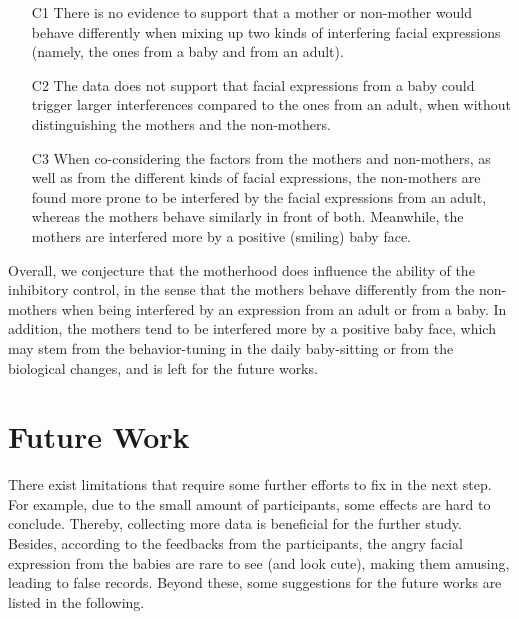 \begin{itemize}
\item[C1] 
There is no evidence to support that
a mother or non-mother would behave differently when mixing up 
two kinds of interfering facial expressions (namely, the ones from a baby 
and from an adult).

\item[C2] 
The data does not support that facial expressions from a baby could trigger larger interferences compared to the ones from an adult, 
when without distinguishing the mothers and the non-mothers.



\item[C3] 
When co-considering the factors from the mothers and non-mothers,
as well as from the different kinds of facial expressions,
the non-mothers are found more prone to be interfered by the facial expressions
from an adult, whereas the mothers behave similarly
in front of both. 
Meanwhile, the mothers are interfered more by a positive (smiling)
baby face.

\end{itemize}

Overall,
we conjecture that the motherhood does influence
the ability of the inhibitory control, in the sense that
the mothers behave differently from the non-mothers
when being interfered by an expression from an adult or from a baby.
In addition, 
the mothers tend to be interfered more by a positive baby face, which may 
stem from the behavior-tuning in the daily baby-sitting or from 
the biological changes, and is left for the future works.


\section{Future Work}\label{sec.discussion.furtherwork}

There exist limitations that require some further efforts to fix in the next step. For example,
due to the small amount of participants, some effects are hard to conclude. Thereby, collecting more data is beneficial for the further study.
Besides, according to the feedbacks from the participants, the angry facial expression from the babies are rare to see (and look cute), making them amusing, leading to false records. 
Beyond these, some suggestions for the future works are listed in the following.

